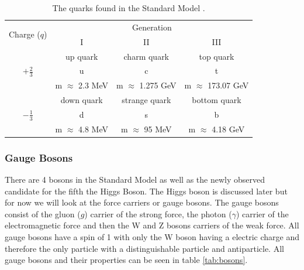     \begin {table}[h]
        \begin{center}
        \begin{tabular}{|c|c|c|c|}
            \hline
            \multirow{2}{*}{Charge ($q$)}      & \multicolumn{3}{c|}{Generation} \\
            \cline{2-4}
                                & I     & II    & III   \\
            \hline
            \multirow{3}{*}{\Large $+\frac{2}{3}$} & up quark & charm quark & top quark \\
                                & {\Huge u}             & {\Huge c}             & {\Huge t} \\
                                & m $\approx$ 2.3 MeV   & m $\approx$ 1.275 GeV & m $\approx$ 173.07 GeV \\
            \hline
            \multirow{3}{*}{\Large $-\frac{1}{3}$}  & down quark & strange quark & bottom quark \\
                                & {\Huge d}             & {\Huge s}             & {\Huge b}     \\
                                & m $\approx$ 4.8 MeV    & m $\approx$ 95 MeV    & m $\approx$ 4.18 GeV \\
            \hline
        \end{tabular}
        \caption{The quarks found in the Standard Model \cite{ulrik:GriffEP2008}.}
        \label{tab:quarks}
        \end{center}
    \end {table}



    \subsubsection*{Gauge Bosons}
    There are 4 bosons in the Standard Model as well as the newly observed candidate for the fifth the Higgs Boson. The Higgs boson is discussed later but for now we will look at the force carriers or gauge bosons. The gauge bosons consist of the gluon ($g$) carrier of the strong force, the photon ($\gamma$) carrier of the electromagnetic force and then the W and Z bosons carriers of the weak force. All gauge bosons have a spin of 1 with only the W boson having a electric charge and therefore the only particle with a distinguishable particle and antiparticle. All gauge bosons and their properties can be seen in table \ref{tab:bosons}.\\

